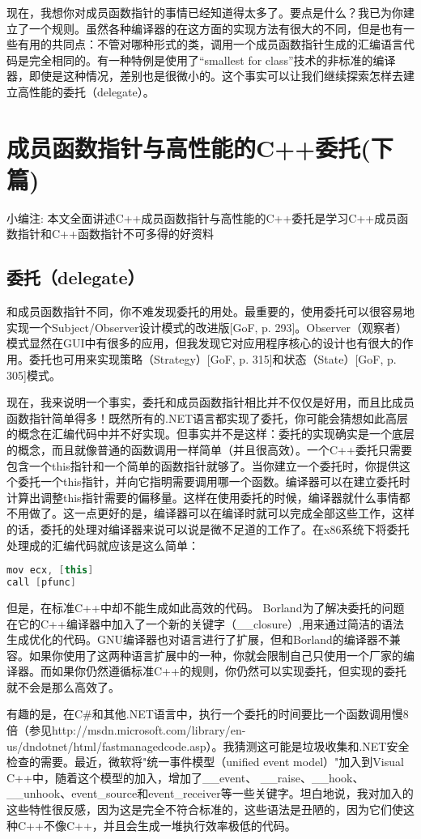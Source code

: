 \documentclass{article}
\begin{document}
\begin{CJK}{UTF8}{gbsn}
现在，我想你对成员函数指针的事情已经知道得太多了。要点是什么？我已为你建立了一个规则。虽然各种编译器的在这方面的实现方法有很大的不同，但是也有一些有用的共同点：不管对哪种形式的类，调用一个成员函数指针生成的汇编语言代码是完全相同的。有一种特例是使用了“smallest for class”技术的非标准的编译器，即使是这种情况，差别也是很微小的。这个事实可以让我们继续探索怎样去建立高性能的委托（delegate）。


\section{成员函数指针与高性能的C++委托(下篇)}
小编注: 本文全面讲述C++成员函数指针与高性能的C++委托是学习C++成员函数指针和C++函数指针不可多得的好资料
 
\subsection{委托（delegate）}
和成员函数指针不同，你不难发现委托的用处。最重要的，使用委托可以很容易地实现一个Subject/Observer设计模式的改进版[GoF, p. 293]。Observer（观察者）模式显然在GUI中有很多的应用，但我发现它对应用程序核心的设计也有很大的作用。委托也可用来实现策略（Strategy）[GoF, p. 315]和状态（State）[GoF, p. 305]模式。

现在，我来说明一个事实，委托和成员函数指针相比并不仅仅是好用，而且比成员函数指针简单得多！既然所有的.NET语言都实现了委托，你可能会猜想如此高层的概念在汇编代码中并不好实现。但事实并不是这样：委托的实现确实是一个底层的概念，而且就像普通的函数调用一样简单（并且很高效）。一个C++委托只需要包含一个this指针和一个简单的函数指针就够了。当你建立一个委托时，你提供这个委托一个this指针，并向它指明需要调用哪一个函数。编译器可以在建立委托时计算出调整this指针需要的偏移量。这样在使用委托的时候，编译器就什么事情都不用做了。这一点更好的是，编译器可以在编译时就可以完成全部这些工作，这样的话，委托的处理对编译器来说可以说是微不足道的工作了。在x86系统下将委托处理成的汇编代码就应该是这么简单：
\begin{lstlisting}[language=c++]
mov ecx, [this]
call [pfunc]
\end{lstlisting}
但是，在标准C++中却不能生成如此高效的代码。 Borland为了解决委托的问题在它的C++编译器中加入了一个新的关键字（\_\_closure）,用来通过简洁的语法生成优化的代码。GNU编译器也对语言进行了扩展，但和Borland的编译器不兼容。如果你使用了这两种语言扩展中的一种，你就会限制自己只使用一个厂家的编译器。而如果你仍然遵循标准C++的规则，你仍然可以实现委托，但实现的委托就不会是那么高效了。

有趣的是，在C\#和其他.NET语言中，执行一个委托的时间要比一个函数调用慢8倍（参见http://msdn.microsoft.com/library/en-us/dndotnet/html/fastmanagedcode.asp）。我猜测这可能是垃圾收集和.NET安全检查的需要。最近，微软将"统一事件模型（unified event model）"加入到Visual C++中，随着这个模型的加入，增加了\_\_event、 \_\_raise、\_\_hook、\_\_unhook、event\_source和event\_receiver等一些关键字。坦白地说，我对加入的这些特性很反感，因为这是完全不符合标准的，这些语法是丑陋的，因为它们使这种C++不像C++，并且会生成一堆执行效率极低的代码。


\end{CJK}
\end{document}
